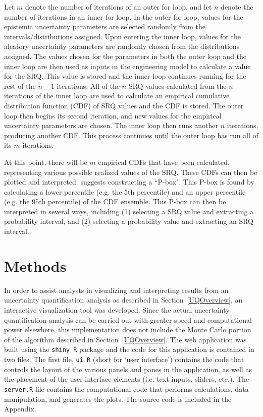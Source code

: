 \documentclass[11pt]{asaproc}\usepackage[]{graphicx}\usepackage[]{color}
\begin{document}
Let $m$ denote the number of iterations of an outer for loop, and let $n$ denote the number of iterations in an inner for loop. In the outer for loop, values for the epistemic uncertainty parameters are selected randomly from the intervals/distributions assigned. Upon entering the inner loop, values for the aleatory uncertainty parameters are randomly chosen from the distributions assigned. The values chosen for the parameters in both the outer loop and the inner loop are then used as inputs in the engineering model to calculate a value for the SRQ. This value is stored and the inner loop continues running for the rest of the $n-1$ iterations. All of the $n$ SRQ values calculated from the $n$ iterations of the inner loop are used to calculate an empirical cumulative distribution function (CDF) of SRQ values and the CDF is stored. The outer loop then begins its second iteration, and new values for the empirical uncertainty parameters are chosen. The inner loop then runs another $n$ iterations, producing another CDF. This process continues until the outer loop has run all of its $m$ iterations. 

At this point, there will be $m$ empirical CDFs that have been calculated, representing various possible realized values of the SRQ. These CDFs can then be plotted and interpreted. \cite{EW2018} suggests constructing a ``P-box". This P-box is found by calculating a lower percentile (e.g. the 5th percentile) and an upper percentile (e.g. the 95th percentile) of the CDF ensemble. This P-box can then be interpreted in several ways, including (1) selecting a SRQ value and extracting a probability interval, and (2) selecting a probability value and extracting an SRQ interval.

\section{Methods}  
\label{Methods}

In order to assist analysts in visualizing and interpreting results from an uncertainty quantification analysis as described in Section~\ref{UQOverview}, an interactive visualization tool was developed. Since the actual uncertainty quantification analysis can be carried out with greater speed and computational power elsewhere, this implementation does not include the Monte Carlo portion of the algorithm described in Section~\ref{UQOverview}. The web application was built using the {\tt shiny R} package \citep{SHINY} and the code for this application is contained in two files. The first file, {\tt ui.R} (short for `user interface') contains the code that controls the layout of the various panels and panes in the application, as well as the placement of the user interface elements (i.e. text inputs, sliders, etc.). The {\tt server.R} file contains the computational code that performs calculations, data manipulation, and generates the plots. The source code is included in the Appendix.
\end{document}
